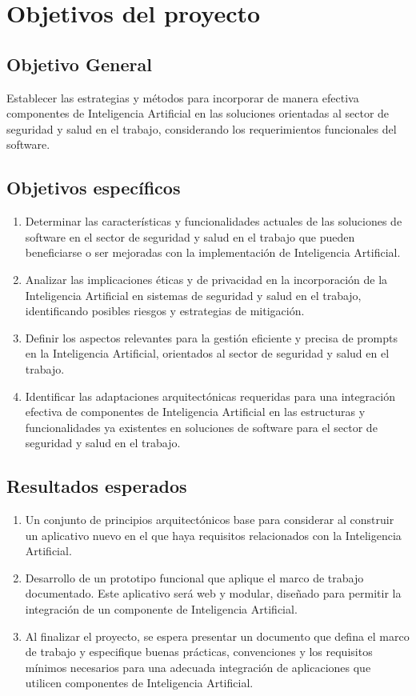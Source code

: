 \section{Objetivos del proyecto}
\subsection{Objetivo General}
Establecer las estrategias y métodos para incorporar de manera efectiva componentes de Inteligencia Artificial en las soluciones orientadas al sector de seguridad y salud en el trabajo, considerando los requerimientos funcionales del software.

\subsection{Objetivos específicos}
\begin{enumerate}
    \item Determinar las características y funcionalidades actuales de las soluciones de software en el sector de seguridad y salud en el trabajo que pueden beneficiarse o ser mejoradas con la implementación de Inteligencia Artificial.
    \item Analizar las implicaciones éticas y de privacidad en la incorporación de la Inteligencia Artificial en sistemas de seguridad y salud en el trabajo, identificando posibles riesgos y estrategias de mitigación.
    \item Definir los aspectos relevantes para la gestión eficiente y precisa de prompts en la Inteligencia Artificial, orientados al sector de seguridad y salud en el trabajo.
    \item Identificar las adaptaciones arquitectónicas requeridas para una integración efectiva de componentes de Inteligencia Artificial en las estructuras y funcionalidades ya existentes en soluciones de software para el sector de seguridad y salud en el trabajo.
\end{enumerate}

\subsection{Resultados esperados}
\begin{enumerate}
    \item Un conjunto de principios arquitectónicos base para considerar al construir un aplicativo nuevo en el que haya requisitos relacionados con la Inteligencia Artificial.
    \item Desarrollo de un prototipo funcional que aplique el marco de trabajo documentado. Este aplicativo será web y modular, diseñado para permitir la integración de un componente de Inteligencia Artificial.
    \item Al finalizar el proyecto, se espera presentar un documento que defina el marco de trabajo y especifique buenas prácticas, convenciones y los requisitos mínimos necesarios para una adecuada integración de aplicaciones que utilicen componentes de Inteligencia Artificial.
\end{enumerate}